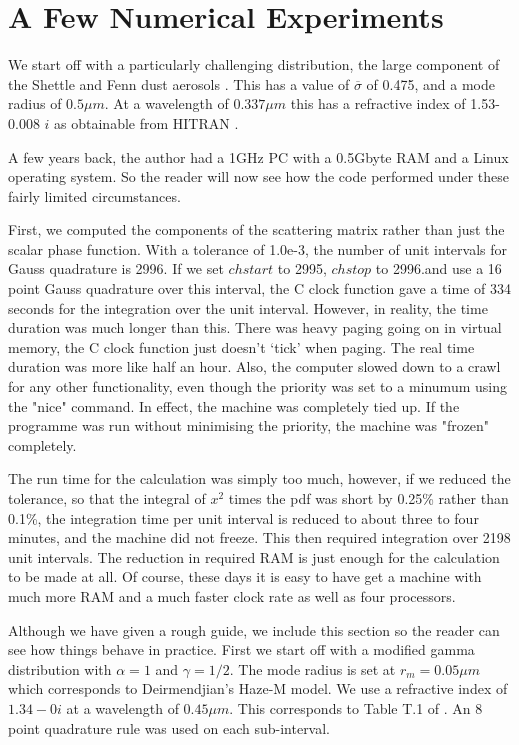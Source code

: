 \section{A Few Numerical Experiments}

\begin{flushleft}

We start off with a particularly challenging distribution, the large component
of the Shettle and Fenn dust aerosols \cite{ShettleFenn:Mybib}. This has
a value of $\overline \sigma$ of 0.475, and a mode radius of $0.5\mu m$.
At a wavelength of $0.337 \mu m$ this has a refractive index of 1.53-0.008 $i$
 as obtainable from  HITRAN \cite{RothmanETAL:Mybib}. 

A few years back, the  author had a 1GHz PC with a 0.5Gbyte RAM and a Linux
 operating system. So the reader
will now see how the code performed under these fairly limited circumstances.

First, we computed the components of the scattering matrix rather than just the
 scalar phase function.
With a tolerance of 1.0e-3, the number of unit intervals for Gauss quadrature
is 2996.  If we set $chstart$ to 2995, $chstop$ to 2996.and use a 16 point Gauss quadrature
 over this interval, the C clock function gave a time of 334 seconds for the 
integration over the unit interval. However, in reality, the time duration was much longer than this.
There was heavy paging going on in virtual memory, the C clock function
just doesn't `tick' when paging. The real time duration was more like half an hour.
 Also, the computer slowed down to a crawl for any other functionality, even though the priority
 was set to a minumum using the "nice" command. In effect, the machine was completely tied up.
 If the programme was run without minimising the priority, the machine was "frozen" completely. 

The run time for the calculation was simply too much, however, if we reduced the 
tolerance, so that the integral of $x^2$ times the pdf was short by 0.25\% rather
 than 0.1\%, the 
integration time per unit interval is reduced to about three to four minutes, and the 
machine did not freeze. This then required integration over 2198 unit intervals.
The reduction in required RAM is just enough for the calculation to be made at all. 
Of course, these days it is easy  to have get a machine with much more RAM and 
a much faster clock rate as well as four processors.


Although we have given a rough guide, we include this section so the reader
can see how things behave in practice. First we start off with a modified 
gamma distribution with $\alpha=1$ and $\gamma=1/2$. The mode radius is
set at $r_m=0.05 \mu m$ which corresponds to Deirmendjian's Haze-M model.
We use a refractive index of $1.34-0 i$ at a wavelength of $0.45 \mu m$. This corresponds to Table T.1
of \cite{Deirmendjian:Mybib}. An 8 point quadrature rule 
was used on each sub-interval.


\end{flushleft}
